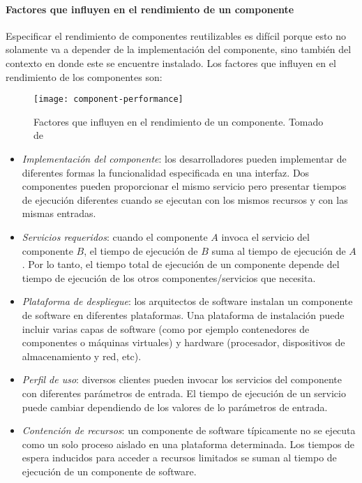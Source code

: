 \paragraph{Factores que influyen en el rendimiento de un componente}
Especificar el rendimiento de componentes reutilizables es difícil porque esto no solamente va a depender de la implementación del componente, sino también del contexto en donde este se encuentre instalado. Los factores que influyen en el rendimiento de los componentes son:

\begin{figure}[h]
  \centering
  \texttt{[image: component-performance]}
  \caption[Factores que influyen en el rendimiento de un componente]{Factores que influyen en el rendimiento de un componente. Tomado de \protect\cite{Koziolek:2010:PEC:1808359.1808729}}
  \label{fig:component-performance}
\end{figure}

\begin{itemize}
    \item \emph{Implementación del componente}: los desarrolladores pueden implementar de diferentes formas la funcionalidad especificada en una interfaz. Dos componentes pueden proporcionar el mismo servicio pero presentar tiempos de ejecución diferentes cuando se ejecutan con los mismos recursos y con las mismas entradas.
    \item \emph{Servicios requeridos}: cuando el componente $A$ invoca el servicio del componente $B$, el tiempo de ejecución de $B$ suma al tiempo de ejecución de $A$. Por lo tanto, el tiempo total de ejecución de un componente depende del tiempo de ejecución de los otros componentes/servicios que necesita.
    \item \emph{Plataforma de despliegue}: los arquitectos de software instalan un componente de software en diferentes plataformas. Una plataforma de instalación puede incluir varias capas de software (como por ejemplo contenedores de componentes o máquinas virtuales) y hardware (procesador, dispositivos de almacenamiento y red, etc).
    \item \emph{Perfil de uso}: diversos clientes pueden invocar los servicios del componente con diferentes parámetros de entrada. El tiempo de ejecución de un servicio puede cambiar dependiendo de los valores de lo parámetros de entrada.
    \item \emph{Contención de recursos}: un componente de software típicamente no se ejecuta como un solo proceso aislado en una plataforma determinada. Los tiempos de espera inducidos para acceder a recursos limitados se suman al tiempo de ejecución de un componente de software.
\end{itemize}

